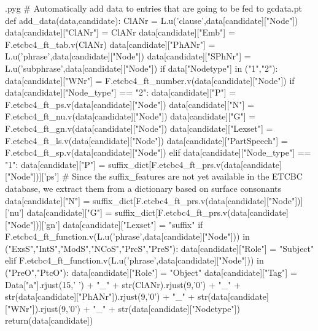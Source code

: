 \documentclass{report}
\makeatletter
\newenvironment{python}{%
  \VerbatimEnvironment
  \minted@resetoptions
  \setkeys{minted@opt}{}
      \begin{VerbatimOut}{\jobname.pyg}}
{%
      \end{VerbatimOut}
      \minted@pygmentize{python}
      \DeleteFile{\jobname.pyg}}
\makeatother
\begin{document}
\begin{python}
# Automatically add data to entries that are going to be fed to gcdata.pt
def add_data(data,candidate):
    ClANr = L.u('clause',data[candidate]["Node"])
    data[candidate]["ClANr"] = ClANr
    data[candidate]["Emb"] = F.etcbc4_ft_tab.v(ClANr)
    data[candidate]["PhANr"] = L.u('phrase',data[candidate]["Node"])
    data[candidate]["SPhNr"] = L.u('subphrase',data[candidate]["Node"])
    if data["Nodetype"] in ("1","2"):
        data[candidate]["WNr"] = F.etcbc4_ft_number.v(data[candidate]["Node"])
    if data[candidate]["Node_type"] == "2":
        data[candidate]["P"] = F.etcbc4_ft_ps.v(data[candidate]["Node"])
        data[candidate]["N"] = F.etcbc4_ft_nu.v(data[candidate]["Node"])
        data[candidate]["G"] = F.etcbc4_ft_gn.v(data[candidate]["Node"])
        data[candidate]["Lexset"] = F.etcbc4_ft_ls.v(data[candidate]["Node"])
        data[candidate]["PartSpeech"] = F.etcbc4_ft_sp.v(data[candidate]["Node"])
    elif data[candidate]["Node_type"] == "1":
        data[candidate]["P"] = suffix_dict[F.etcbc4_ft_prs.v(data[candidate]["Node"])]['ps']    # Since the suffix_features are not yet available in the ETCBC database, we extract them from a dictionary based on surface consonants
        data[candidate]["N"] = suffix_dict[F.etcbc4_ft_prs.v(data[candidate]["Node"])]['nu']
        data[candidate]["G"] = suffix_dict[F.etcbc4_ft_prs.v(data[candidate]["Node"])]['gn']
        data[candidate]["Lexset"] = "suffix"
        if F.etcbc4_ft_function.v(L.u('phrase',data[candidate]["Node"])) in ("ExsS","IntS","ModS","NCoS","PrcS","PreS"):
            data[candidate]["Role"] = "Subject"
        elif F.etcbc4_ft_function.v(L.u('phrase',data[candidate]["Node"])) in ("PreO","PtcO"):
            data[candidate]["Role"] = "Object"
    data[candidate]["Tag"] = Data["a"].rjust(15,' ') + "_" + str(ClANr).rjust(9,'0') + "_" + str(data[candidate]["PhANr"]).rjust(9,'0') + "_" + str(data[candidate]["WNr"]).rjust(9,'0') + "_" + str(data[candidate]["Nodetype"])
    return(data[candidate])

\end{python}
\end{document}
